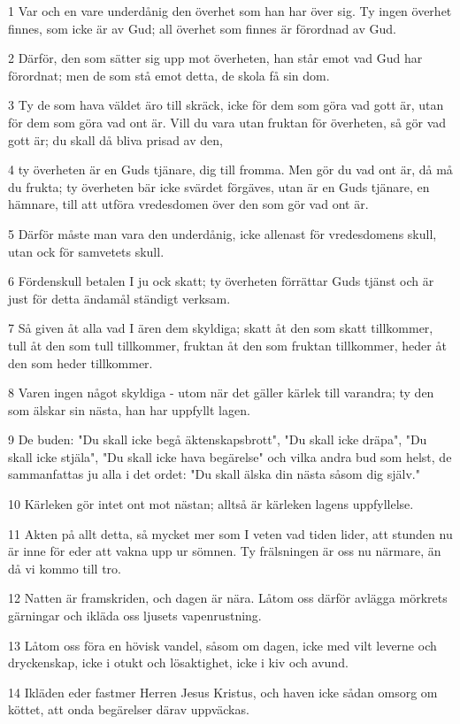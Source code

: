 \par 1 Var och en vare underdånig den överhet som han har över sig. Ty ingen överhet finnes, som icke är av Gud; all överhet som finnes är förordnad av Gud.
\par 2 Därför, den som sätter sig upp mot överheten, han står emot vad Gud har förordnat; men de som stå emot detta, de skola få sin dom.
\par 3 Ty de som hava väldet äro till skräck, icke för dem som göra vad gott är, utan för dem som göra vad ont är. Vill du vara utan fruktan för överheten, så gör vad gott är; du skall då bliva prisad av den,
\par 4 ty överheten är en Guds tjänare, dig till fromma. Men gör du vad ont är, då må du frukta; ty överheten bär icke svärdet förgäves, utan är en Guds tjänare, en hämnare, till att utföra vredesdomen över den som gör vad ont är.
\par 5 Därför måste man vara den underdånig, icke allenast för vredesdomens skull, utan ock för samvetets skull.
\par 6 Fördenskull betalen I ju ock skatt; ty överheten förrättar Guds tjänst och är just för detta ändamål ständigt verksam.
\par 7 Så given åt alla vad I ären dem skyldiga; skatt åt den som skatt tillkommer, tull åt den som tull tillkommer, fruktan åt den som fruktan tillkommer, heder åt den som heder tillkommer.
\par 8 Varen ingen något skyldiga - utom när det gäller kärlek till varandra; ty den som älskar sin nästa, han har uppfyllt lagen.
\par 9 De buden: "Du skall icke begå äktenskapsbrott", "Du skall icke dräpa", "Du skall icke stjäla", "Du skall icke hava begärelse" och vilka andra bud som helst, de sammanfattas ju alla i det ordet: "Du skall älska din nästa såsom dig själv."
\par 10 Kärleken gör intet ont mot nästan; alltså är kärleken lagens uppfyllelse.
\par 11 Akten på allt detta, så mycket mer som I veten vad tiden lider, att stunden nu är inne för eder att vakna upp ur sömnen. Ty frälsningen är oss nu närmare, än då vi kommo till tro.
\par 12 Natten är framskriden, och dagen är nära. Låtom oss därför avlägga mörkrets gärningar och ikläda oss ljusets vapenrustning.
\par 13 Låtom oss föra en hövisk vandel, såsom om dagen, icke med vilt leverne och dryckenskap, icke i otukt och lösaktighet, icke i kiv och avund.
\par 14 Ikläden eder fastmer Herren Jesus Kristus, och haven icke sådan omsorg om köttet, att onda begärelser därav uppväckas.

